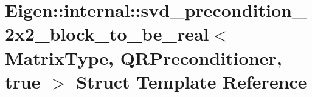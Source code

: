\hypertarget{struct_eigen_1_1internal_1_1svd__precondition__2x2__block__to__be__real_3_01_matrix_type_00_01_qb58fa819a3391e7d55d98ccdc14db9e4}{}\section{Eigen\+:\+:internal\+:\+:svd\+\_\+precondition\+\_\+2x2\+\_\+block\+\_\+to\+\_\+be\+\_\+real$<$ Matrix\+Type, Q\+R\+Preconditioner, true $>$ Struct Template Reference}
\label{struct_eigen_1_1internal_1_1svd__precondition__2x2__block__to__be__real_3_01_matrix_type_00_01_qb58fa819a3391e7d55d98ccdc14db9e4}
